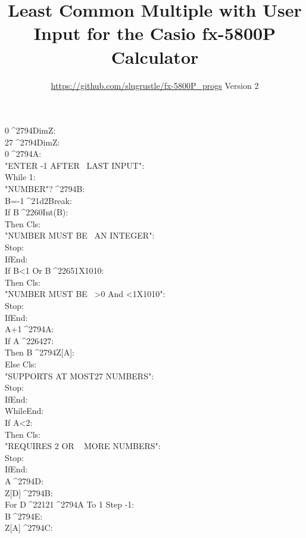 \documentclass[11pt,letterpaper,twocolumn]{article}
\date{}
\newcommand{\STO}{{\large ^^^^2794}}
\newcommand{\CBR}{{\Large ^^^^21d2}}
\newcommand{\NEQ}{^^^^2260}
\newcommand{\LEQ}{^^^^2264}
\newcommand{\GEQ}{^^^^2265}
\newcommand{\MINUS}{^^^^2212}
\newcommand{\EXPTEN}{{\scriptsize X10}}
\newcommand{\IDENT}[1]{\hspace*{#1\BaseIndent}}
\begin{document}
\title{Least Common Multiple with User Input for the Casio fx-5800P Calculator}
\author{\url{https://github.com/slugrustle/fx-5800P_progs} \quad Version 2}
\maketitle
\thispagestyle{fancy}
\begin{linenumbers}
0\STO DimZ:\\
27\STO DimZ:\\
0\STO A:\\
"ENTER -1 AFTER ~LAST INPUT":\\
While 1:\\
\IDENT{1}"NUMBER"?\STO B:\\
\IDENT{1}B=-1\CBR Break:\\
\IDENT{1}If B\NEQ Int(B):\\
\IDENT{2}Then Cls:\\
\IDENT{2}"NUMBER MUST BE ~AN INTEGER":\\
\IDENT{2}Stop:\\
\IDENT{1}IfEnd:\\
\IDENT{1}If B<1 Or B\GEQ 1\EXPTEN 10:\\
\IDENT{2}Then Cls:\\
\IDENT{2}"NUMBER MUST BE ~>0 And <1\EXPTEN 10":\\
\IDENT{2}Stop:\\
\IDENT{1}IfEnd:\\
\IDENT{1}A+1\STO A:\\
\IDENT{1}If A\LEQ 27:\\
\IDENT{2}Then B\STO Z[A]:\\
\IDENT{1}Else Cls:\\
\IDENT{2}"SUPPORTS AT MOST27 NUMBERS":\\
\IDENT{2}Stop:\\
\IDENT{1}IfEnd:\\
WhileEnd:\\
If A<2:\\
\IDENT{1}Then Cls:\\
\IDENT{1}"REQUIRES 2 OR ~ MORE NUMBERS":\\
\IDENT{1}Stop:\\
IfEnd:\\
A\STO D:\\
Z[D]\STO B:\\
For D\MINUS 1\STO A To 1 Step -1:\\
\IDENT{1}B\STO E:\\
\IDENT{1}Z[A]\STO C:\\

\end{linenumbers}
\end{document}
